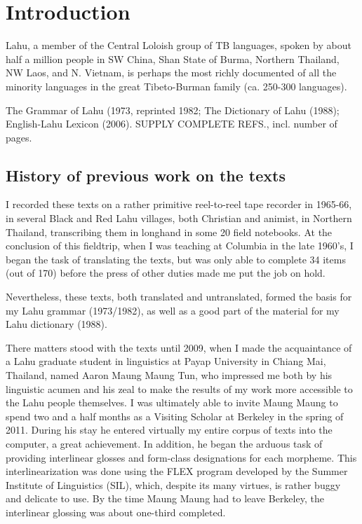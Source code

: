 \vspace{0.25em}

\renewcommand{\thefootnote}{\arabic{footnote}}
\setcounter{footnote}{0}

\chapter*{Introduction}

Lahu, a member of the Central Loloish group of TB languages, spoken by about half a million people in SW China, Shan State of Burma, Northern Thailand, NW Laos, and N. Vietnam,  is perhaps the most richly documented of all the minority languages in the great Tibeto-Burman family (ca. 250-300 languages). 

The Grammar of Lahu (1973, reprinted 1982; The Dictionary of Lahu (1988); English-Lahu Lexicon (2006).  SUPPLY COMPLETE REFS., incl. number of pages.


\section{History of previous work on the texts}

I recorded these texts on a rather primitive reel-to-reel tape recorder in 1965-66, in several Black and Red Lahu villages, both Christian and animist, in Northern Thailand, transcribing them in longhand in some 20 field notebooks. At the conclusion of this fieldtrip, when I was teaching at Columbia in the late 1960’s, I began the task of translating the texts, but was only able to complete 34 items (out of 170) before the press of other duties made me put the job on hold.

Nevertheless, these texts, both translated and untranslated, formed the basis for my Lahu grammar (1973/1982), as well as a good part of the material for my Lahu dictionary (1988). 

There matters stood with the texts until 2009, when I made the acquaintance of a Lahu graduate student in linguistics at Payap University in Chiang Mai, Thailand, named Aaron Maung Maung Tun, who impressed me both by his linguistic acumen and his zeal to make the results of my work more accessible to the Lahu people themselves. I was ultimately able to invite Maung Maung to spend two and a half months as a Visiting Scholar at Berkeley in the spring of 2011.   During his stay he entered virtually my entire corpus of texts into the computer, a great achievement. In addition, he began the arduous task of providing interlinear glosses and form-class designations for each morpheme. This interlinearization was done using the FLEX program developed by the Summer Institute of Linguistics (SIL), which, despite its many virtues, is rather buggy and delicate to use. By the time Maung Maung had to leave Berkeley, the interlinear glossing was about one-third completed.

